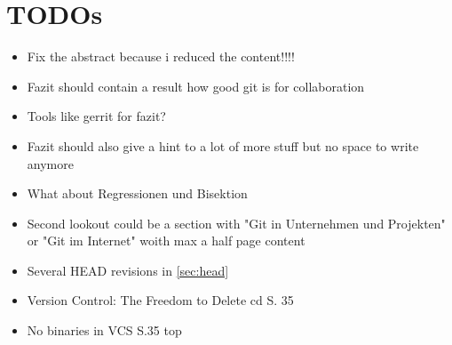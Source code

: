 \chapter{\result}\label{cha:result}

\chapter{TODOs}
\begin{itemize}
\item Fix the abstract because i reduced the content!!!!
\item Fazit should contain a result how good git is for collaboration 
\item Tools like gerrit for fazit?
\item Fazit should also give a hint to a lot of more stuff but no space to write anymore 
\item What about Regressionen und Bisektion
\item Second lookout could be a section with "Git in Unternehmen und Projekten"
or "Git im Internet" woith max a half page content
\item Several HEAD revisions in \ref{sec:head}
\item Version Control: The Freedom to Delete cd S. 35
\item No binaries in VCS S.35 top
\end{itemize}
